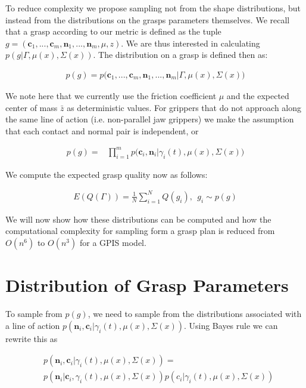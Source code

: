 \documentclass[letterpaper, 10 pt, conference]{ieeeconf}  %
\begin{document}
To reduce complexity we propose sampling not from the shape distributions, but instead from the distributions on the grasps parameters themselves. We recall that a grasp according to our metric is defined as the tuple $g = ( \textbf{c}_1,...,\textbf{c}_m,\textbf{n}_1,...,\textbf{n}_m,\mu, z )$. We are thus interested in calculating $p(g|\Gamma,\mu(x),\Sigma(x))$. The distribution on a grasp is defined then as: 

\begin{align}\label{eq:joint_on_shape}
p(g) = p\big(\textbf{c}_1,...,\textbf{c}_m,\textbf{n}_1,...,\textbf{n}_m|\Gamma,\mu(x),\Sigma(x)\big)
\end{align}

We note here that we currently use the friction coefficient $\mu$ and the expected center of mass $\bar{z}$ as deterministic values. For grippers that do not approach along the same line of action (i.e. non-parallel jaw grippers) we make the assumption that each contact and normal pair is independent, or 

\vspace{-2ex}
\begin{align}\label{eq:independence}
p(g) = &\prod_{i=1}^mp\big(\textbf{c}_i,\textbf{n}_i|\gamma_i(t),\mu(x),\Sigma(x)\big)
\end{align}

We compute the expected grasp quality now as follows: 

\vspace{-2ex}
\begin{align}\label{eq:grasp_sampling}
E(Q(\Gamma)) = \frac{1}{N} \sum_{i=1}^N Q(g_i) , \ \ g_i \sim p(g)
\end{align}

We will now show how these distributions can be computed and how the computational complexity for sampling form a grasp plan is reduced from $O(n^6)$ to $O(n^3)$ for a GPIS model. 

\section{Distribution of Grasp Parameters}
\label{sec:distgrasp}
 
 To sample from $p(g)$, we need to sample from the distributions associated with a line of action $p(\textbf{n}_i,\textbf{c}_i|\gamma_i(t),\mu(x),\Sigma(x))$. Using Bayes rule we can rewrite this as 
 
 \vspace{-2ex}
 \begin{align*}
 &p(\textbf{n}_i,\textbf{c}_i|\gamma_i(t),\mu(x),\Sigma(x))=\\
 &p(\textbf{n}_i|\textbf{c}_i,\gamma_i(t),\mu(x),\Sigma(x))p(c_i|\gamma_i(t),\mu(x),\Sigma(x))
 \end{align*}
 
\end{document}
